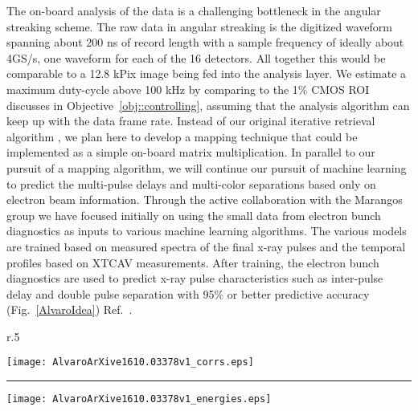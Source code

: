 \documentclass[letterpaper,oneside,11pt]{article}
\begin{document}
The on-board analysis of the data is a challenging bottleneck in the angular streaking scheme.
The raw data in angular streaking is the digitized waveform spanning about 200 ns of record length with a sample frequency of ideally about 4GS/s, one waveform for each of the 16 detectors.
All together this would be comparable to a 12.8 kPix image being fed into the analysis layer.
We estimate a maximum duty-cycle above 100 kHz by comparing to the 1\% CMOS ROI discusses in Objective~\ref{obj::controlling}, assuming that the analysis algorithm can keep up with the data frame rate.
Instead of our original iterative retrieval algorithm \cite{Nick2016}, we plan here to develop a mapping technique that could be implemented as a simple on-board matrix multiplication.
In parallel to our pursuit of a mapping algorithm, we will continue our pursuit of machine learning to predict the multi-pulse delays and multi-color separations based only on electron beam information.
Through the active collaboration with the Marangos group we have focused initially on using the small data from electron bunch diagnostics as inputs to various machine learning algorithms. \cite{AlvaroML2016}
The various models are trained based on measured spectra of the final x-ray pulses and the temporal profiles based on XTCAV measurements.
After training, the electron bunch diagnostics are used to predict x-ray pulse characteristics such as inter-pulse delay and double pulse separation with 95\% or better predictive accuracy (Fig.~\ref{AlvaroIdea}) Ref.~\cite{AlvaroML2016}. 

\begin{wrapfigure}[27]{r}{.5\linewidth}
\vspace{-1\baselineskip}
\centerline{
\texttt{[image: AlvaroArXive1610.03378v1\_corrs.eps]}
}
\hrule
\centerline{
\texttt{[image: AlvaroArXive1610.03378v1\_energies.eps]}
}
\vspace{-2\baselineskip}
\caption{\label{AlvaroIdea} The efficacy of machine learning for predicting temporal delay (top) and color separation (bottom) for shaped FEL pulses. \cite{AlvaroML2016}}
\end{wrapfigure}
\end{document}
